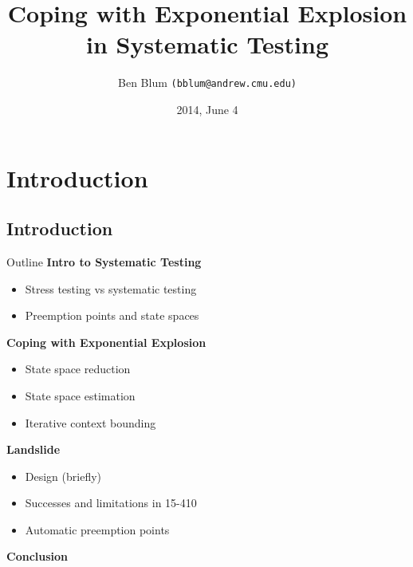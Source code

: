 \documentclass[xcolor=dvipsnames]{beamer}
\title[Landslide]{{\bf Coping with Exponential Explosion in Systematic Testing}}
\author[Ben Blum]{Ben Blum \texttt{(bblum@andrew.cmu.edu)}}
\institute[CMU]{Carnegie Mellon University}
\date[]{2014, June 4}
\begin{document}
\normalem
\begin{frame}
	\titlepage
\end{frame}


\newcommand\linegap{\vspace{0.2in}}
\newcommand\breakslide[1]{\begin{frame}{} \begin{center} {\Large #1} \end{center} \end{frame}}

\section{Introduction}


\subsection{Introduction}

\begin{frame}{Outline}
	\textbf{Intro to Systematic Testing}
	\begin{itemize}
		\item Stress testing vs systematic testing
		\item Preemption points and state spaces
	\end{itemize}
	{\bf Coping with Exponential Explosion}
	\begin{itemize}
		\item State space reduction
		\item State space estimation
		\item Iterative context bounding
	\end{itemize}
	{\bf Landslide}
	\begin{itemize}
		\item Design (briefly) %
		\item Successes and limitations in 15-410
		\item Automatic preemption points
	\end{itemize}
	{\bf Conclusion}
\end{frame}
\end{document}
